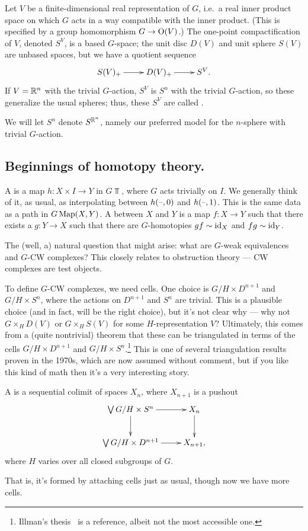 \begin{exm}
Let $V$ be a finite-dimensional real representation of $G$, i.e.\ a real inner product space on which $G$ acts in a
way compatible with the inner product. (This is specified by a group homomorphism $G\to\mathrm O(V)$.) The one-point
compactification of $V$, denoted $S^V$, is a based $G$-space; the unit disc $D(V)$ and unit sphere $S(V)$ are
unbased spaces, but we have a quotient sequence
\[\xymatrix{
	S(V)_+\ar[r] & D(V)_+\ar[r] & S^V.
}\]
If $V = \mathbb R^n$ with the trivial $G$-action, $S^V$ is $S^n$ with the trivial $G$-action, so these generalize the
usual spheres; thus, these $S^V$ are called .
\end{exm}
We will let $S^n$ denote $S^{\mathbb R^n}$, namely our preferred model for the $n$-sphere with trivial $G$-action.
\subsection*{Beginnings of homotopy theory.}
\begin{defn}
A  is a map $h\colon X\times I\to Y$ in $G\Top$, where $G$ acts trivially on $I$. We generally
think of it, as usual, as interpolating between $h(\text{--}, 0)$ and $h(\text{--}, 1)$. This is the same data as a path in
$G\operatorname{Map}(X,Y)$. A  between $X$ and $Y$ is a map $f\colon X\to Y$ such that there
exists a $g\colon Y\to X$ such that there are $G$-homotopies $gf\sim \mathrm{id}_X$ and $fg\sim\mathrm{id}_Y$.
\end{defn}
The (well, a) natural question that might arise: what are $G$-weak equivalences and $G$-CW complexes? This closely
relates to obstruction theory --- CW complexes are test objects.

To define $G$-CW complexes, we need cells. One choice is $G/H\times D^{n+1}$ and $G/H\times S^n$, where the actions
on $D^{n+1}$ and $S^n$ are trivial. This is a plausible choice (and in fact, will be the right choice), but it's
not clear why --- why not $G\times_H D(V)$ or $G\times_H S(V)$ for some $H$-representation $V$? Ultimately, this
comes from a (quite nontrivial) theorem that these can be triangulated in terms of the cells $G/H\times D^{n+1}$
and $G/H\times S^n$.\footnote{Illman's thesis~\cite{IllmanThesis} is a reference, albeit not the most accessible
one.} This is one of several triangulation results proven in the 1970s, which are now assumed without comment, but
if you like this kind of math then it's a very interesting story.
\begin{defn}
A  is a sequential colimit of spaces $X_n$, where $X_{n+1}$ is a pushout
\[\xymatrix{\bigvee G/H\times S^n\ar[r]\ar[d] & X_n\ar[d]\\
\bigvee G/H\times D^{n+1}\ar[r] & X_{n+1},
}\]
where $H$ varies over all closed subgroups of $G$.
\end{defn}
That is, it's formed by attaching cells just as usual, though now we have more cells.

